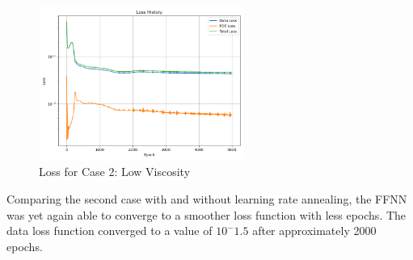 \documentclass[11pt]{article}
\begin{document}
\begin{figure}[h]
    \centering
    \includegraphics[width=0.6\textwidth]{1D_Loss_NU2_Annealing.png}
    \caption{Loss for Case 2: Low Viscosity}
    \label{fig:Loss_NU2_LR}
\end{figure}

Comparing the second case with and without learning rate annealing, the FFNN was yet again able to converge to a smoother loss function with less epochs. The data loss function converged to a value of $10^-1.5$ after approximately 2000 epochs.

\pagebreak
\end{document}
